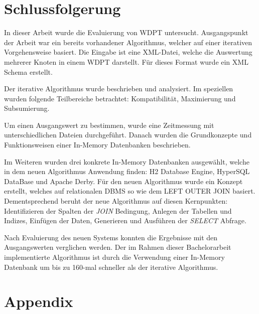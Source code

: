 \documentclass[draft,final]{vutinfth} %
\begin{document}
\chapter{Schlussfolgerung}


In dieser Arbeit wurde die Evaluierung von WDPT untersucht. Ausgangspunkt der Arbeit war ein bereits vorhandener Algorithmus, welcher auf einer iterativen Vorgehensweise basiert.
Die Eingabe ist eine XML-Datei, welche die Auswertung mehrerer Knoten in einem WDPT darstellt. Für dieses Format wurde ein XML Schema erstellt.

Der iterative Algorithmus wurde beschrieben und analysiert. Im speziellen wurden folgende Teilbereiche betrachtet: Kompatibilität, Maximierung und Subsumierung.

Um einen Ausgangswert zu bestimmen, wurde eine Zeitmessung mit unterschiedlichen Dateien durchgeführt. 
Danach wurden die Grundkonzepte und Funktionsweisen einer In-Memory Datenbanken beschrieben. 

Im Weiteren wurden drei konkrete In-Memory Datenbanken ausgewählt, welche in dem neuen Algorithmus Anwendung finden: H2 Database Engine, HyperSQL DataBase und Apache Derby.
Für den neuen Algorithmus wurde ein Konzept erstellt, welches auf relationalen DBMS so wie dem LEFT OUTER JOIN basiert. 
Dementsprechend beruht der neue Algorithmus auf diesen Kernpunkten: Identifizieren der Spalten der \textit{JOIN} Bedingung, Anlegen der Tabellen und Indizes, Einfügen der Daten, Generieren und Ausführen der \textit{SELECT} Abfrage.

Nach Evaluierung des neuen Systems konnten die Ergebnisse mit den Ausgangswerten verglichen werden. Der im Rahmen dieser Bachelorarbeit implementierte Algorithmus ist durch die Verwendung einer In-Memory Datenbank um bis zu 160-mal schneller als der iterative Algorithmus.
   

\chapter*{Appendix}
\end{document}
